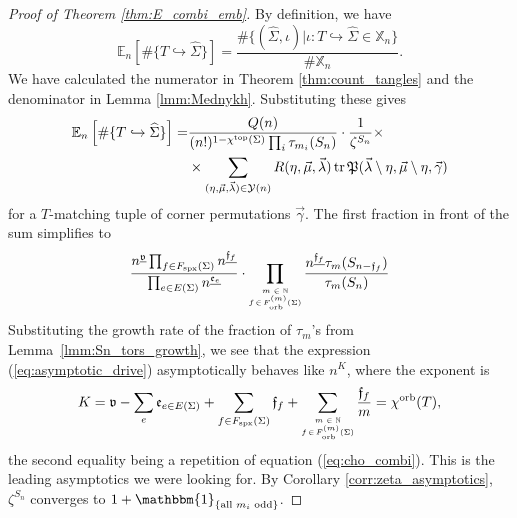 \documentclass{amsart}
\newcommand{\cho}{\chi^{\textnormal{orb}}}
\newcommand{\covers}{\mathbb{X}_n}
\newcommand{\Fspx}{F_{\textnormal{spx}}}
\newcommand{\Forb}[1][m]{F^{(#1)}_{\textnormal{orb}}}
\newcommand{\iterorb}{{\tiny\begin{matrix}m\in\mathbb{N}\\f\!\in\!\Forb(\Sigma)\end{matrix}}}
\newcommand{\tn}{\textnormal}
\newcommand{\tr}{\operatorname{tr}}
\newcommand{\whS}{{\widehat{\Sigma}}}
\begin{document}
\begin{proof}[Proof of Theorem \ref{thm:E_combi_emb}]
By definition, we have
\begin{equation*}
\mathbb{E}_n\left[\#\{T\hookrightarrow\whS\}\right]=\frac{\#\{(\whS,\iota)|\iota\colon T\hookrightarrow\whS\in\covers\}}{\#\covers}.
\end{equation*}
We have calculated the numerator in Theorem \ref{thm:count_tangles} and the denominator in Lemma \ref{lmm:Mednykh}. Substituting these gives
\begin{align}\begin{split}\label{eq:ratio_formulae}
\mathbb{E}_n\left[\#\{T\hookrightarrow\whS\}\right]=&\frac{Q(n)}{(n!)^{1-\chi^\tn{top}(\Sigma)}\prod_i\tau_{m_i}(S_n)}\cdot\frac{1}{\zeta^{S_n}}\times\\
&\times\sum_{(\eta,\vec\mu,\vec\lambda)\in\mathcal{Y}(n)}R(\eta,\vec\mu,\vec\lambda)\tr\mathfrak{P}(\vec\lambda\setminus\eta,\vec\mu\setminus\eta,\vec\gamma)
\end{split}\end{align}
for a $T$-matching tuple of corner permutations $\vec\gamma$. The first fraction in front of the sum simplifies to
\begin{equation}\label{eq:asymptotic_drive}
\frac{n^{\underline{\mathfrak{v}}}\prod_{f\in\Fspx(\Sigma)}n^{\underline{\mathfrak{f}_f}}}{\prod_{e\in E(\Sigma)}n^{\underline{\mathfrak{e}_e}}}\cdot\prod_\iterorb\frac{n^{\underline{\mathfrak{f}_f}}\tau_m(S_{n-\mathfrak{f}_f})}{\tau_m(S_n)}
\end{equation}
Substituting the growth rate of the fraction of $\tau_m$'s from Lemma~\ref{lmm:Sn_tors_growth}, we see that the expression (\ref{eq:asymptotic_drive}) asymptotically behaves like $n^K$, where the exponent is
\begin{equation*}
K=\mathfrak{v}-\sum_e\mathfrak{e}_{e\in E(\Sigma)}+\sum_{f\in\Fspx(\Sigma)}\mathfrak{f}_f+\sum_\iterorb\frac{\mathfrak{f}_f}{m}=\cho(T),
\end{equation*}
the second equality being a repetition of equation (\ref{eq:cho_combi}). This is the leading asymptotics we were looking for. By Corollary \ref{corr:zeta_asymptotics}, $\zeta^{S_n}$ converges to $1+\mathbbm{1}_{\{\text{all }m_i\text{ odd}\}}$.


\end{proof}
\end{document}
